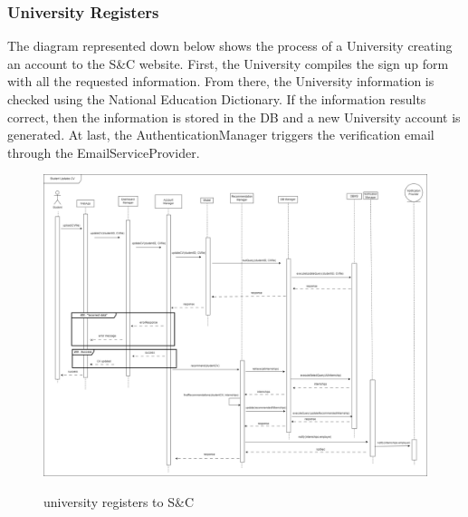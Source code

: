 \documentclass[a4paper,12pt]{article}
\begin{document}
\subsubsection*{University Registers}
The diagram represented down below shows the process of a University creating an account to the S\&C website. First, the University compiles the sign up form with all the requested information. From there, the University information is checked using the National Education Dictionary. If the information results correct, then the information is stored in the DB and a new University account is generated. At last, the AuthenticationManager
triggers the verification email through the EmailServiceProvider.
\begin{figure}[H]
\centering
\includegraphics[scale = 0.30]{DD_figures/RuntimeView/StudentUpdatesCV_RV.drawio.png}\\
\caption{university registers to S\&C}
\end{figure}
\end{document}
